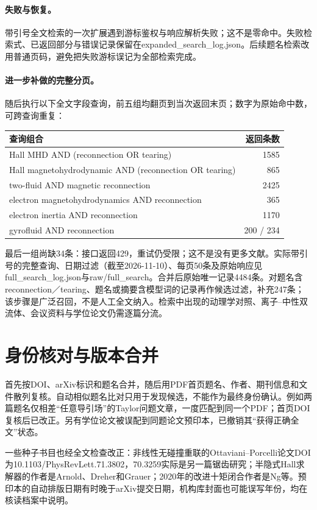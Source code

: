 \paragraph{失败与恢复。}带引号全文检索的一次扩展遇到游标鉴权与响应解析失败；这不是零命中。失败检索式、已返回部分与错误记录保留在expanded\_search\_log.json。后续题名检索改用普通页码，避免把失败游标误记为全部检索完成。

\paragraph{进一步补做的完整分页。}随后执行以下全文字段查询，前五组均翻页到当次返回末页；数字为原始命中数，可跨查询重复：
\begin{center}\small
\begin{tabular}{lr}\toprule 查询组合 & 返回条数\\\midrule
Hall MHD AND (reconnection OR tearing)&1585\\
Hall magnetohydrodynamic AND (reconnection OR tearing)&865\\
two-fluid AND magnetic reconnection&2425\\
electron magnetohydrodynamics AND reconnection&365\\
electron inertia AND reconnection&1170\\
gyrofluid AND reconnection&200 / 234\\\bottomrule
\end{tabular}\end{center}
最后一组尚缺34条：接口返回429，重试仍受限；这不是没有更多文献。实际带引号的完整查询、日期过滤（截至2026-11-10）、每页50条及原始响应见full\_search\_log.json与raw/full\_search。合并后原始唯一记录4484条。对题名含reconnection／tearing、题名或摘要含模型词的记录再作候选过滤，补充247条；该步骤是广泛召回，不是人工全文纳入。检索中出现的动理学对照、离子--中性双流体、会议资料与学位论文仍需逐篇分流。

\section{身份核对与版本合并}
首先按DOI、arXiv标识和题名合并，随后用PDF首页题名、作者、期刊信息和文件散列复核。自动相似题名比对只用于发现候选，不能作为最终身份确认。例如两篇题名仅相差“任意导引场”的Taylor问题文章，一度匹配到同一个PDF；首页DOI复核后已改正。另有学位论文被误配到同题论文预印本，已撤销其“获得正确全文”状态。

一些种子书目也经全文检查改正：非线性无碰撞重联的Ottaviani--Porcelli论文DOI为10.1103/PhysRevLett.71.3802，70.3259实际是另一篇锯齿研究；半隐式Hall求解器的作者是Arnold、Dreher和Grauer；2020年的改进十矩闭合作者是Ng等。预印本的自动排版日期有时晚于arXiv提交日期，机构库封面也可能误写年份，均在核读档案中说明。

